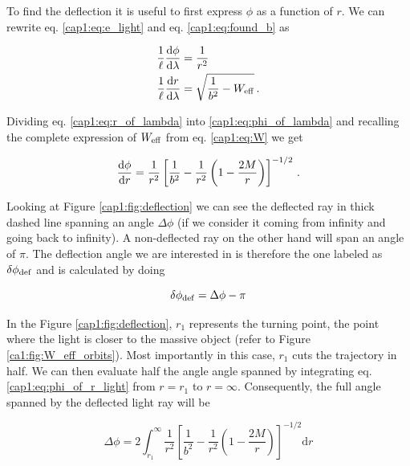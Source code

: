 To find the deflection it is useful to first express $\phi$ as a function of
$r$.
We can rewrite eq. \ref{cap1:eq:e_light} and eq. \ref{cap1:eq:found_b} as

\begin{subequations}
\begin{align}
    \frac{1}{\ell} \dv{\phi}{\lambda} &= \frac{1}{r^2}
    \label{cap1:eq:phi_of_lambda} \\
    \frac{1}{\ell} \dv{r}{\lambda} &= \sqrt{\frac{1}{b^2} - W_{\rm eff}}
    \label{cap1:eq:r_of_lambda} \, .
\end{align}
\end{subequations}

Dividing eq. \ref{cap1:eq:r_of_lambda} into \ref{cap1:eq:phi_of_lambda} and
recalling the complete expression of $W_{\rm eff}$ from eq. \ref{cap1:eq:W} we
get

\begin{equation}
    \dv{\phi}{r} = \frac{1}{r^2} \left[\frac{1}{b^2}
    - \frac{1}{r^2} \left(1 - \frac{2M}{r} \right) \right]^{-1/2} \, .
    \label{cap1:eq:phi_of_r_light}
\end{equation}

Looking at Figure \ref{cap1:fig:deflection} we can see the deflected ray in
thick dashed line spanning an angle $\Delta \phi$ (if we consider it coming from
infinity and going back to infinity).
A non-deflected ray on the other hand will span an angle of $\pi$.
The deflection angle we are interested in is therefore the one labeled as
$\delta \phi_{\rm def}$ and is calculated by doing

\begin{equation}
    \delta \phi_{\rm def} = \Delta \phi - \pi
    \label{cap1:eq:delta_Delta}
\end{equation}

In the Figure \ref{cap1:fig:deflection}, $r_1$ represents the turning point, the
point where the light is closer to the massive object (refer to Figure
\ref{ca1:fig:W_eff_orbits}).
Most importantly in this case, $r_1$ cuts the trajectory in half.
We can then evaluate half the angle angle spanned by integrating eq.
\ref{cap1:eq:phi_of_r_light} from $r = r_1$ to $r = \infty$.
Consequently, the full angle spanned by the deflected light ray will be

\begin{equation}
    \Delta \phi = 2\int_{r_1}^\infty \frac{1}{r^2} \left[\frac{1}{b^2}
    - \frac{1}{r^2} \left(1 - \frac{2M}{r} \right) \right]^{-1/2} \mathrm{d}r
    \label{cap1:eq:deflection}
\end{equation}

